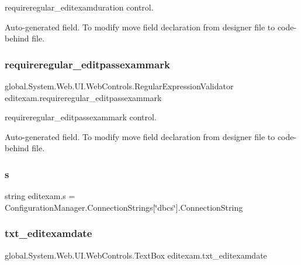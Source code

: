 requireregular\+\_\+editexamduration control. 

Auto-\/generated field. To modify move field declaration from designer file to code-\/behind file. \mbox{\label{classeditexam_acfaeba15e3d7e1e4c4cf5b1668371030}} 
\subsubsection{\texorpdfstring{requireregular\_editpassexammark}{requireregular\_editpassexammark}}
{\footnotesize\ttfamily global.\+System.\+Web.\+U\+I.\+Web\+Controls.\+Regular\+Expression\+Validator editexam.\+requireregular\+\_\+editpassexammark\hspace{0.3cm}{\ttfamily [protected]}}



requireregular\+\_\+editpassexammark control. 

Auto-\/generated field. To modify move field declaration from designer file to code-\/behind file. \mbox{\label{classeditexam_a9e1dff99910d4ac210d1536b1351e432}} 
\subsubsection{\texorpdfstring{s}{s}}
{\footnotesize\ttfamily string editexam.\+s = Configuration\+Manager.\+Connection\+Strings\mbox{[}\char`\"{}dbcs\char`\"{}\mbox{]}.Connection\+String\hspace{0.3cm}{\ttfamily [private]}}

\mbox{\label{classeditexam_a6f4f3b5e57f0060b59c62a60f343e229}} 
\subsubsection{\texorpdfstring{txt\_editexamdate}{txt\_editexamdate}}
{\footnotesize\ttfamily global.\+System.\+Web.\+U\+I.\+Web\+Controls.\+Text\+Box editexam.\+txt\+\_\+editexamdate\hspace{0.3cm}{\ttfamily [protected]}}



